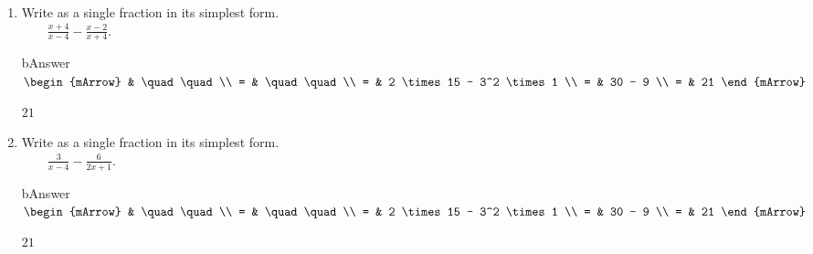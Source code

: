 \clearpage
\begin{enumerate}
  \item \begin{exercise} Write as a single fraction in its simplest form. \\
                               $ \quad\quad \frac{x+4}{x-4} - \frac{x-2}{x+4}  $. 
        \begin{envOut}[height=11cm]{bAnswer}
		     $\begin{mArrow}
		        & \quad\quad                      \\ 
              = & \quad\quad      \\ 
              = & 2 \times 15 - 3^2 \times 1     \\ 
              = & 30 - 9                       \\
              = & 21						  
	         \end{mArrow}$
        \end{envOut}			  
	    \begin{shortsolution}$21$\end{shortsolution}
	  \end{exercise}

  \item \begin{exercise} Write as a single fraction in its simplest form. \\
                               $ \quad\quad \frac{3}{x-4} - \frac{6}{2x+1}  $. 
        \begin{envOut}[height=11cm]{bAnswer}
		     $\begin{mArrow}
		        & \quad\quad                      \\ 
              = & \quad\quad      \\ 
              = & 2 \times 15 - 3^2 \times 1     \\ 
              = & 30 - 9                       \\
              = & 21						  
	         \end{mArrow}$
        \end{envOut}			  
	    \begin{shortsolution}$21$\end{shortsolution}
	  \end{exercise}
	  

\end{enumerate}
